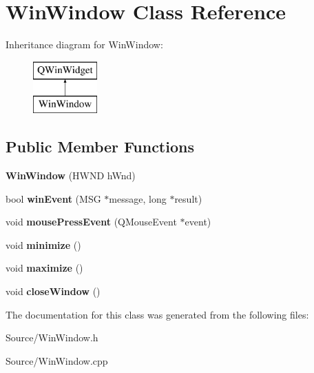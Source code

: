 \hypertarget{class_win_window}{}\section{Win\+Window Class Reference}
\label{class_win_window}
Inheritance diagram for Win\+Window\+:\begin{figure}[H]
\begin{center}
\leavevmode
\includegraphics[height=2.000000cm]{class_win_window}
\end{center}
\end{figure}
\subsection*{Public Member Functions}
\begin{DoxyCompactItemize}
\item 
\hypertarget{class_win_window_a0202882046787311be223531617524ea}{}{\bfseries Win\+Window} (H\+W\+N\+D h\+Wnd)\label{class_win_window_a0202882046787311be223531617524ea}

\item 
\hypertarget{class_win_window_a5d1366438e2f2e48e2133cf91e627518}{}bool {\bfseries win\+Event} (M\+S\+G $\ast$message, long $\ast$result)\label{class_win_window_a5d1366438e2f2e48e2133cf91e627518}

\item 
\hypertarget{class_win_window_ac993eeacebd75b49fdfe6a90fe180557}{}void {\bfseries mouse\+Press\+Event} (Q\+Mouse\+Event $\ast$event)\label{class_win_window_ac993eeacebd75b49fdfe6a90fe180557}

\item 
\hypertarget{class_win_window_a84a2fb8deba19139b71ad17f8c2e1fee}{}void {\bfseries minimize} ()\label{class_win_window_a84a2fb8deba19139b71ad17f8c2e1fee}

\item 
\hypertarget{class_win_window_adccb69f545be0bb0635a62545258e619}{}void {\bfseries maximize} ()\label{class_win_window_adccb69f545be0bb0635a62545258e619}

\item 
\hypertarget{class_win_window_a96353a265ce984eaadbdf863f72542c8}{}void {\bfseries close\+Window} ()\label{class_win_window_a96353a265ce984eaadbdf863f72542c8}

\end{DoxyCompactItemize}


The documentation for this class was generated from the following files\+:\begin{DoxyCompactItemize}
\item 
Source/Win\+Window.\+h\item 
Source/Win\+Window.\+cpp\end{DoxyCompactItemize}
